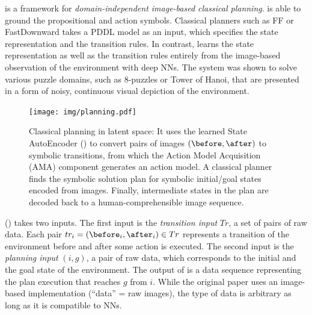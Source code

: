 \textbf{\latentplanner} \cite{Asai2018} is a framework for
\emph{domain-independent image-based classical planning}.
\latentplanner is able to ground
the propositional and action symbols.
% 
Classical planners such as FF \cite{Hoffmann01} or
FastDownward \cite{Helmert04} takes a PDDL model as an input, which
specifies the state representation and the transition rules.
In contrast, \latentplanner learns the state representation as well as the transition rules
entirely from the image-based observation of the environment with deep NNs.
The system was shown to solve various puzzle domains, such as 8-puzzles or Tower of Hanoi,
that are presented in a form of noisy, continuous visual depiction of the environment.

\begin{figure}[tb]
 \centering
 \texttt{[image: img/planning.pdf]}
 \caption{Classical planning in latent space:
It uses the learned State AutoEncoder () to convert pairs of images $(\before,\after)$ to symbolic transitions,
 from which the Action Model Acquisition (AMA) component generates an action model.
A classical planner finds the symbolic solution plan for symbolic initial/goal states encoded from images.
Finally, intermediate states in the plan are decoded back to a human-comprehensible image sequence.}
\label{fig:overview}
\end{figure}

\latentplanner () takes two inputs.
The first input is the \emph{transition input} $Tr$, a set of pairs of raw data.
Each pair $tr_i=(\before_i, \after_i) \in Tr$ represents a transition of the environment before and after some action is executed.
The second input is the \emph{planning input} $(i, g)$, a pair of raw data, which corresponds to the initial and the goal state of the environment.
The output of \latentplanner is a data sequence representing the plan execution that reaches $g$ from $i$.
While the original paper uses an image-based implementation (``data'' = raw images),
the type of data is arbitrary as long as it is compatible to NNs.


